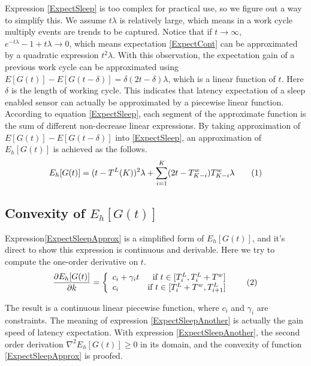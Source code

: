 \documentclass[conference]{IEEEtran}
\newcommand\numberthis{\addtocounter{equation}{1}\tag{\theequation}}
\begin{document}
Expression \eqref{ExpectSleep} is too complex for practical use, so we figure out a way to simplify this. 
We assume $t\lambda$ is relatively large, which means in a work cycle multiply events are trends to be captured.
Notice that if $t\rightarrow \infty$, $e^{-t\lambda}-1+t \lambda \rightarrow 0$, which means expectation \eqref{ExpectCont} can be approximated by a quadratic expression $t^2\lambda$.
With this observation, the expectation gain of a previous work cycle can be approximated using $E[G(t)]-E[G(t-\delta)] = \delta (2 t - \delta)\lambda$, which is a linear function of $t$. Here $\delta$ is the length of working cycle.
This indicates that latency expectation of a sleep enabled sensor can actually be approximated by a piecewise linear function.
According to equation \eqref{ExpectSleep}, each segment of the approximate function is the sum of different non-decrease linear expressions.
By taking approximation of $E[G(t)]-E[G(t-\delta)]$ into \eqref{ExpectSleep}, an approximation of $E_h[G(t)]$ is achieved as the follows.
\begin{align*}
E_h[G(t)] = (t-T^{L}(K))^2\lambda + \sum_{i=1}^{K} (2 t - T^{w}_{K-i})T^{w}_{K-i}\lambda
\numberthis 
\label{ExpectSleepApprox}
\end{align*}

\subsection{Convexity of $E_h[G(t)]$}
Expression\eqref{ExpectSleepApprox} is a simplified form of $E_h[G(t)]$, and it's direct to show this expression is continuous and derivable. Here we try to compute the one-order derivative on $t$.
\[\frac{\partial E_h[G(t)]}{\partial k} = \left\{
	\begin{array}{lr}
	c_i+\gamma_i t & \text{if }t \in [T^{L}_{i}, T^{L}_{i}+T^{w}]\\
	c_i & \text{if }t \in [T^{L}_{i}+T^{w}, T^{L}_{i+1}]
	\end{array}	\numberthis \label{ExpectSleepAnother}
	\right.
\]

The result is a continuous linear piecewise function, where $c_i$ and $\gamma_i$ are constraints. The meaning of expression \eqref{ExpectSleepAnother} is actually the gain speed of latency expectation. With expression \eqref{ExpectSleepAnother}, the second order derivation $\nabla^{2} E_h[G(t)]\geq0$ in its domain, and the convexity of function \eqref{ExpectSleepApprox} is proofed\cite{boyd2004convex}. 
\end{document}
